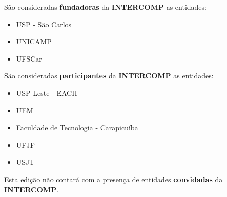 \begin{article}
	\begin{xparagraph}
		São consideradas \textbf{fundadoras} da \textbf{INTERCOMP} as entidades:
		\begin{itemize}[noitemsep,leftmargin=2\parindent]
			\item USP - São Carlos
			\item UNICAMP
			\item UFSCar
		\end{itemize}
	\end{xparagraph}

	\begin{xparagraph}
		São consideradas \textbf{participantes} da \textbf{INTERCOMP} as entidades:
		\begin{itemize}[noitemsep,leftmargin=2\parindent]
			\item USP Leste - EACH
			\item UEM
			\item Faculdade de Tecnologia - Carapicuíba
			\item UFJF
			\item USJT
		\end{itemize}
	\end{xparagraph}

	\begin{xparagraph}
		Esta edição não contará com a presença de entidades \textbf{convidadas} da \textbf{INTERCOMP}.
	\end{xparagraph}


\end{article}
